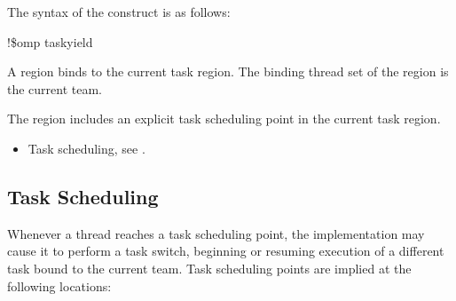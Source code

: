 \fortranspecificstart
The syntax of the  construct is as follows:

\begin{boxedcode}
!\$omp taskyield
\end{boxedcode}
\fortranspecificend

\binding
A  region binds to the current task region. The binding thread set of the 
 region is the current team.

\descr
The  region includes an explicit task scheduling point in the current task 
region.

\crossreferences
\begin{itemize}
\item Task scheduling, see 
. 
\end{itemize}













\subsection{Task Scheduling}
\label{subsec:Task Scheduling}
Whenever a thread reaches a task scheduling point, the implementation may cause it to 
perform a task switch, beginning or resuming execution of a different task bound to the 
current team. Task scheduling points are implied at the following locations:

